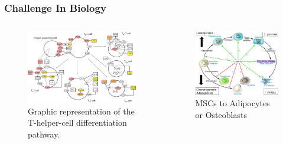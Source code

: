 \documentclass{beamer}
\begin{document}
\begin{frame}
\frametitle{Challenge In Biology}

\begin{columns}[c]

\begin{figure}
\includegraphics[width=\linewidth,height=\textheight,keepaspectratio]{cell_differentiation.jpg}
\caption{Graphic representation of the T-helper-cell differentiation pathway.}
\end{figure}

\begin{figure}
\includegraphics[width=\linewidth,height=\textheight,keepaspectratio]{osteo_vs_adip.jpg}
\caption{MSCs to Adipocytes or Osteoblasts}
\end{figure}

\end{columns}
\end{frame}
\end{document}
